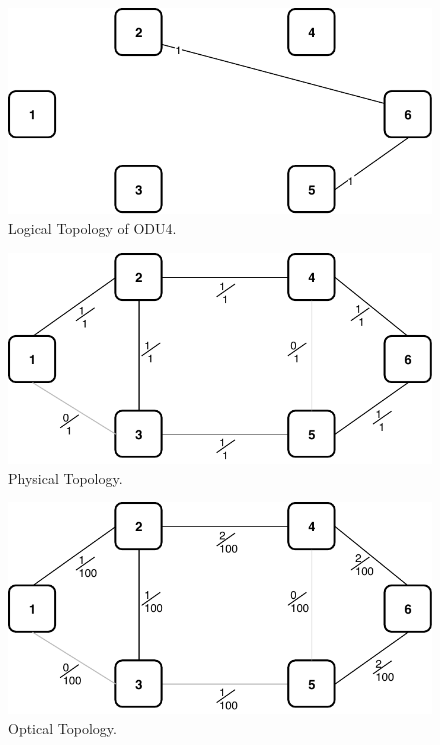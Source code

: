 \begin{figure}[h!]
\centering
\includegraphics[width=12cm]{sdf/ilp/opaque_survivability/figures/logical_topology_ODU4_low}
\caption{Logical Topology of ODU4.}
\label{logical_ODU4_low}
\end{figure}

\begin{figure}[h!]
\centering
\includegraphics[width=12cm]{sdf/ilp/opaque_survivability/figures/physical_topology_low}
\caption{Physical Topology.}
\label{physical_low}
\end{figure}

\begin{figure}[h!]
\centering
\includegraphics[width=12cm]{sdf/ilp/opaque_survivability/figures/optical_topology_low}
\caption{Optical Topology.}
\label{optical_low}
\end{figure}

